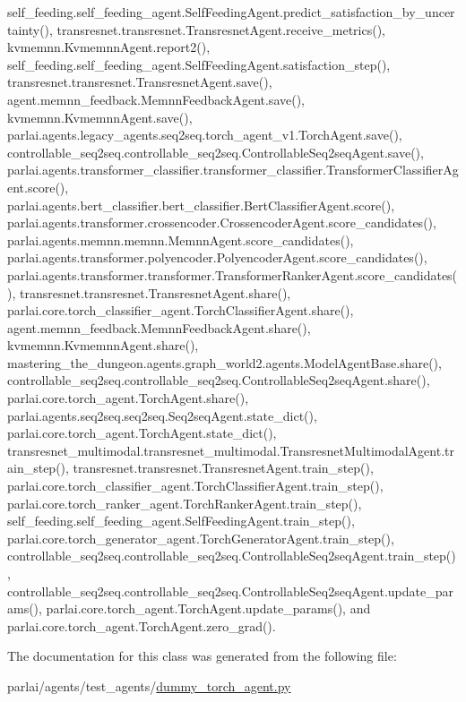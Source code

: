 self\+\_\+feeding.\+self\+\_\+feeding\+\_\+agent.\+Self\+Feeding\+Agent.\+predict\+\_\+satisfaction\+\_\+by\+\_\+uncertainty(), transresnet.\+transresnet.\+Transresnet\+Agent.\+receive\+\_\+metrics(), kvmemnn.\+Kvmemnn\+Agent.\+report2(), self\+\_\+feeding.\+self\+\_\+feeding\+\_\+agent.\+Self\+Feeding\+Agent.\+satisfaction\+\_\+step(), transresnet.\+transresnet.\+Transresnet\+Agent.\+save(), agent.\+memnn\+\_\+feedback.\+Memnn\+Feedback\+Agent.\+save(), kvmemnn.\+Kvmemnn\+Agent.\+save(), parlai.\+agents.\+legacy\+\_\+agents.\+seq2seq.\+torch\+\_\+agent\+\_\+v1.\+Torch\+Agent.\+save(), controllable\+\_\+seq2seq.\+controllable\+\_\+seq2seq.\+Controllable\+Seq2seq\+Agent.\+save(), parlai.\+agents.\+transformer\+\_\+classifier.\+transformer\+\_\+classifier.\+Transformer\+Classifier\+Agent.\+score(), parlai.\+agents.\+bert\+\_\+classifier.\+bert\+\_\+classifier.\+Bert\+Classifier\+Agent.\+score(), parlai.\+agents.\+transformer.\+crossencoder.\+Crossencoder\+Agent.\+score\+\_\+candidates(), parlai.\+agents.\+memnn.\+memnn.\+Memnn\+Agent.\+score\+\_\+candidates(), parlai.\+agents.\+transformer.\+polyencoder.\+Polyencoder\+Agent.\+score\+\_\+candidates(), parlai.\+agents.\+transformer.\+transformer.\+Transformer\+Ranker\+Agent.\+score\+\_\+candidates(), transresnet.\+transresnet.\+Transresnet\+Agent.\+share(), parlai.\+core.\+torch\+\_\+classifier\+\_\+agent.\+Torch\+Classifier\+Agent.\+share(), agent.\+memnn\+\_\+feedback.\+Memnn\+Feedback\+Agent.\+share(), kvmemnn.\+Kvmemnn\+Agent.\+share(), mastering\+\_\+the\+\_\+dungeon.\+agents.\+graph\+\_\+world2.\+agents.\+Model\+Agent\+Base.\+share(), controllable\+\_\+seq2seq.\+controllable\+\_\+seq2seq.\+Controllable\+Seq2seq\+Agent.\+share(), parlai.\+core.\+torch\+\_\+agent.\+Torch\+Agent.\+share(), parlai.\+agents.\+seq2seq.\+seq2seq.\+Seq2seq\+Agent.\+state\+\_\+dict(), parlai.\+core.\+torch\+\_\+agent.\+Torch\+Agent.\+state\+\_\+dict(), transresnet\+\_\+multimodal.\+transresnet\+\_\+multimodal.\+Transresnet\+Multimodal\+Agent.\+train\+\_\+step(), transresnet.\+transresnet.\+Transresnet\+Agent.\+train\+\_\+step(), parlai.\+core.\+torch\+\_\+classifier\+\_\+agent.\+Torch\+Classifier\+Agent.\+train\+\_\+step(), parlai.\+core.\+torch\+\_\+ranker\+\_\+agent.\+Torch\+Ranker\+Agent.\+train\+\_\+step(), self\+\_\+feeding.\+self\+\_\+feeding\+\_\+agent.\+Self\+Feeding\+Agent.\+train\+\_\+step(), parlai.\+core.\+torch\+\_\+generator\+\_\+agent.\+Torch\+Generator\+Agent.\+train\+\_\+step(), controllable\+\_\+seq2seq.\+controllable\+\_\+seq2seq.\+Controllable\+Seq2seq\+Agent.\+train\+\_\+step(), controllable\+\_\+seq2seq.\+controllable\+\_\+seq2seq.\+Controllable\+Seq2seq\+Agent.\+update\+\_\+params(), parlai.\+core.\+torch\+\_\+agent.\+Torch\+Agent.\+update\+\_\+params(), and parlai.\+core.\+torch\+\_\+agent.\+Torch\+Agent.\+zero\+\_\+grad().



The documentation for this class was generated from the following file\+:\begin{DoxyCompactItemize}
\item 
parlai/agents/test\+\_\+agents/\hyperlink{dummy__torch__agent_8py}{dummy\+\_\+torch\+\_\+agent.\+py}\end{DoxyCompactItemize}
